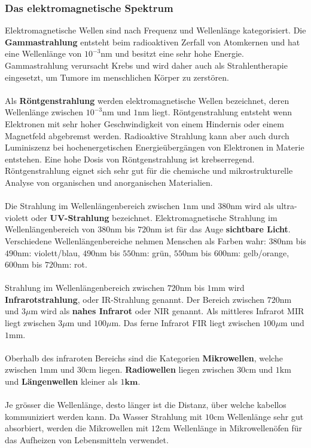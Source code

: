\subsubsection{Das elektromagnetische Spektrum}
Elektromagnetische Wellen sind nach Frequenz und Wellenlänge kategorisiert. Die \textbf{Gammastrahlung} entsteht beim radioaktiven Zerfall von Atomkernen und hat eine Wellenlänge von $10^{-3}\text{nm}$ und besitzt eine sehr hohe Energie. Gammastrahlung verursacht Krebs und wird daher auch als Strahlentherapie eingesetzt, um Tumore im menschlichen Körper zu zerstören.
\\\\
Als \textbf{Röntgenstrahlung} werden elektromagnetische Wellen bezeichnet, deren Wellenlänge zwischen $10^{-3}\text{nm}$ und $1\text{nm}$ liegt. Röntgenstrahlung entsteht wenn Elektronen mit sehr hoher Geschwindigkeit von einem Hindernis oder einem Magnetfeld abgebremst werden. Radioaktive Strahlung kann aber auch durch Luminiszenz bei hochenergetischen Energieübergängen von Elektronen in Materie entstehen. Eine hohe Dosis von Röntgenstrahlung ist krebserregend. Röntgenstrahlung eignet sich sehr gut für die chemische und mikrostrukturelle Analyse von organischen und anorganischen Materialien. 
\\\\
Die Strahlung im Wellenlängenbereich zwischen $1\text{nm}$ und $380\text{nm}$ wird als ultra-violett oder \textbf{UV-Strahlung} bezeichnet. Elektromagnetische Strahlung im Wellenlängenbereich von $380\text{nm}$ bis $720\text{nm}$ ist für das Auge \textbf{sichtbare Licht}. Verschiedene Wellenlängenbereiche nehmen Menschen als Farben wahr: $380\text{nm}$ bis $490\text{nm}$: violett/blau, $490\text{nm}$ bis $550\text{nm}$: grün, $550\text{nm}$ bis $600\text{nm}$: gelb/orange, $600\text{nm}$ bis $720\text{nm}$: rot.
\\\\
Strahlung im Wellenlängenbereich zwischen $720\text{nm}$ bis $1\text{mm}$ wird \textbf{Infrarotstrahlung}, oder IR-Strahlung genannt. Der Bereich zwischen $720\text{nm}$ und $3\mu\text{m}$ wird als \textbf{nahes Infrarot} oder NIR genannt. Als mittleres Infrarot MIR liegt zwischen $3\mu\text{m}$ und $100\mu\text{m}$. Das ferne Infrarot FIR liegt zwischen $100\mu\text{m}$ und $1\text{mm}$.
\\\\
Oberhalb des infraroten Bereichs sind die Kategorien \textbf{Mikrowellen}, welche zwischen $1\text{mm}$ und $30\text{cm}$ liegen. \textbf{Radiowellen} liegen zwischen $30\text{cm}$ und $1\text{km}$ und \textbf{Längenwellen} kleiner als $1\textbf{km}$.
\\\\
Je grösser die Wellenlänge, desto länger ist die Distanz, über welche kabellos kommuniziert werden kann. Da Wasser Strahlung mit $10\text{cm}$ Wellenlänge sehr gut absorbiert, werden die Mikrowellen mit $12\text{cm}$ Wellenlänge in Mikrowellenöfen für das Aufheizen von Lebensmitteln verwendet.
